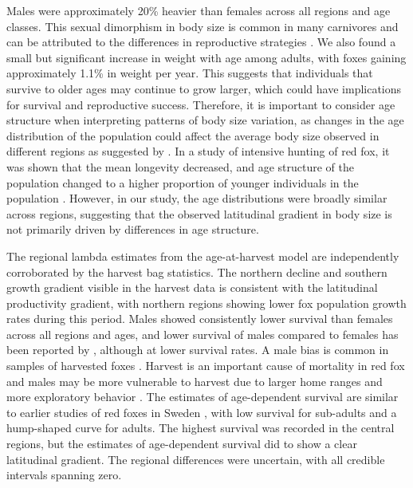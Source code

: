 \documentclass[12pt,a4paper,final,abstract=true,headings=small]{scrartcl}
\begin{document}
Males were approximately 20\% heavier than females across all regions and age classes. This sexual dimorphism in body size is common in many carnivores and can be attributed to the differences in reproductive strategies \citep{gittlemanCarnivoreBodySize1985, moorsSexualDimorphismBody1980}. We also found a small but significant increase in weight with age among adults, with foxes gaining approximately 1.1\% in weight per year. This suggests that individuals that survive to older ages may continue to grow larger, which could have implications for survival and reproductive success. Therefore, it is important to consider age structure when interpreting patterns of body size variation, as changes in the age distribution of the population could affect the average body size observed in different regions as suggested by \citet{theriotAccountingAgeUncovering2024a}. In a study of intensive hunting of red fox, it was shown that the mean longevity decreased, and age structure of the population changed to a higher proportion of younger individuals in the population \citep{yonedaEffectsHuntingAge1982}. However, in our study, the age distributions were broadly similar across regions, suggesting that the observed latitudinal gradient in body size is not primarily driven by differences in age structure.

The regional lambda estimates from the age-at-harvest model are independently corroborated by the harvest bag statistics. The northern decline and southern growth gradient visible in the harvest data is consistent with the latitudinal productivity gradient, with northern regions showing lower fox population growth rates during this period. Males showed consistently lower survival than females across all regions and ages, and lower survival of males compared to females has been reported by \citet{heydonDemographyRuralFoxes2000}, although at lower survival rates. A male bias is common in samples of harvested foxes \citep{englundAspectsReproductionMortality1970,yonedaEffectsHuntingAge1982}. Harvest is an important cause of mortality in red fox and males may be more vulnerable to harvest due to larger home ranges and more exploratory behavior \citep{heydonDemographyRuralFoxes2000}. The estimates of age-dependent survival are similar to earlier studies of red foxes in Sweden \citep{devenish-nelsonDemographyCarnivoreRed2013, willebrandDecliningSurvivalRates2022}, with low survival for sub-adults and a hump-shaped curve for adults. The highest survival was recorded in the central regions, but the estimates of age-dependent survival did to show a clear latitudinal gradient. The regional differences were uncertain, with all credible intervals spanning zero.
\end{document}
